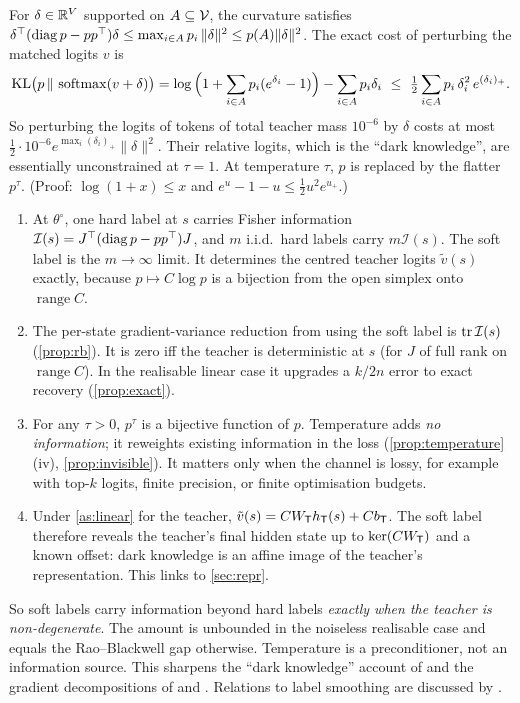 \begin{proposition}[Low-probability tokens are invisible at $\tau=1$]\label{prop:invisible}
\Pv\Ck For $\delta\in\mathbb{R}^V$ supported on $A\subseteq\mathcal{V}$, the curvature satisfies
$\delta^\top(\operatorname{diag} p-pp^\top)\delta\le\max_{i\in A}p_i\,\|\delta\|^2\le p(A)\|\delta\|^2$. The exact cost of perturbing the
matched logits $v$ is
\[
\KL\big(p\,\|\,\softmax(v+\delta)\big)=\log\Big(1+\sum_{i\in A}p_i(e^{\delta_i}-1)\Big)-\sum_{i\in A}p_i\delta_i\ \le\ \tfrac12\sum_{i\in A}p_i\,\delta_i^2\,e^{(\delta_i)_+}.
\]
So perturbing the logits of tokens of total teacher mass $10^{-6}$ by $\delta$ costs at most
$\frac12\cdot10^{-6}e^{\max_i(\delta_i)_+}\|\delta\|^2$. Their relative logits, which is the ``dark knowledge'', are
essentially unconstrained at $\tau=1$. At temperature $\tau$, $p$ is replaced by the flatter $p^\tau$. (Proof:
$\log(1+x)\le x$ and $e^u-1-u\le\frac12u^2e^{u_+}$.)
\end{proposition}

\begin{proposition}\label{prop:soft-info}
\Pv
\begin{enumerate}[label=(\alph*),nosep]
\item At $\theta^\circ$, one hard label at $s$ carries Fisher information $\mathcal I(s)=J^\top(\operatorname{diag} p-pp^\top)J$,
and $m$ i.i.d.\ hard labels carry $m\mathcal I(s)$. The soft label is the $m\to\infty$ limit. It determines the
centred teacher logits $\tilde v(s)$ exactly, because $p\mapsto C\log p$ is a bijection from the open simplex
onto $\operatorname{range}C$.
\item The per-state gradient-variance reduction from using the soft label is $\operatorname{tr}\mathcal I(s)$
(\cref{prop:rb}). It is zero iff the teacher is deterministic at $s$ (for $J$ of full rank on
$\operatorname{range}C$). In the realisable linear case it upgrades a $k/2n$ error to exact recovery
(\cref{prop:exact}).
\item For any $\tau>0$, $p^\tau$ is a bijective function of $p$. Temperature adds \emph{no information}; it
reweights existing information in the loss (\cref{prop:temperature}(iv), \cref{prop:invisible}). It
matters only when the channel is lossy, for example with top-$k$ logits, finite precision, or finite
optimisation budgets.
\item Under \cref{as:linear} for the teacher, $\tilde v(s)=CW_{\mathsf{T}} h_{\mathsf{T}}(s)+Cb_{\mathsf{T}}$. The soft label therefore reveals
the teacher's final hidden state up to $\ker(CW_{\mathsf{T}})$ and a known offset: dark knowledge is an affine image
of the teacher's representation. This links to \cref{sec:repr}.
\end{enumerate}
\end{proposition}
\noindent
So soft labels carry information beyond hard labels \emph{exactly when the teacher is non-degenerate}.
The amount is unbounded in the noiseless realisable case and equals the Rao--Blackwell gap otherwise.
Temperature is a preconditioner, not an information source. This sharpens the ``dark knowledge'' account
of \citet{hinton2015distilling} and the gradient decompositions of \citet{furlanello2018born} and
\citet{tang2020understanding}. Relations to label smoothing are discussed by \citet{muller2019does}.


